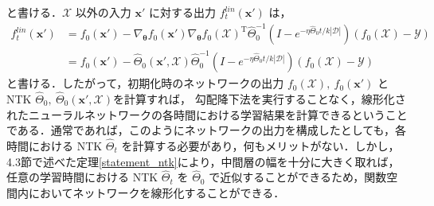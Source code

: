 \documentclass[a4paper]{bxjsarticle}
\theoremstyle{definition}
\begin{document}
と書ける．$\mathcal{X}$ 以外の入力 $\bm{x}'$ に対する出力 $f_t^{lin}(\bm{x}')$ は，
\begin{align}
    f_t^{lin}(\bm{x}') &= f_0(\bm{x}') - \nabla_{\bm{\theta}}f_0(\bm{x}')\nabla_{\bm{\theta}}f_0(\mathcal{X})^{\mathrm{T}}\hat{\Theta}_{0}^{-1}\left(I - e^{-\eta\hat{\Theta}_0 t/k|\mathcal{D}|}\right)(f_0(\mathcal{X})- \mathcal{Y}) \\
    &= f_0(\bm{x}') - \hat{\Theta}_0(\bm{x}', \mathcal{X}) \hat{\Theta}_0^{-1}\left(I - e^{-\eta\hat{\Theta}_0 t/k|\mathcal{D}|}\right)(f_0(\mathcal{X})- \mathcal{Y})
\end{align}
と書ける．したがって，初期化時のネットワークの出力 $f_0(\mathcal{X}), \ f_0(\bm{x}')$ とNTK $\hat{\Theta}_0, \ \hat{\Theta}_0(\bm{x}',\mathcal{X})$を計算すれば， 勾配降下法を実行することなく，線形化されたニューラルネットワークの各時間における学習結果を計算できるということである．通常であれば，このようにネットワークの出力を構成したとしても，各時間における NTK $\hat{\Theta}_t$ を計算する必要があり，何もメリットがない．しかし，4.3節で述べた定理\ref{statement_ntk}により，中間層の幅を十分に大きく取れば，任意の学習時間における NTK $\hat{\Theta}_t$ を $\hat{\Theta}_0$ で近似することができるため，関数空間内においてネットワークを線形化することができる．

\renewcommand{\bibname}{参考文献}


\end{document}
